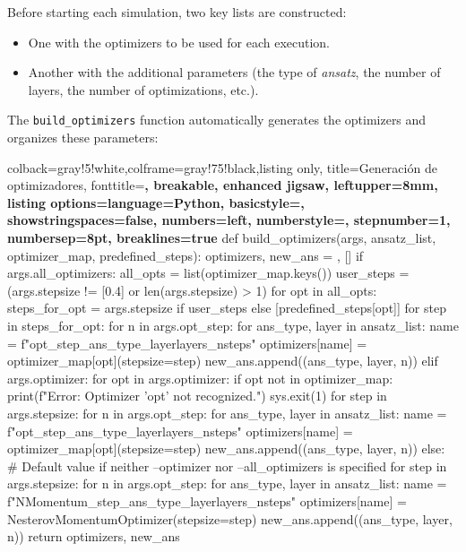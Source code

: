 Before starting each simulation, two key lists are constructed:
\begin{itemize}
    \item One with the optimizers to be used for each execution.
    \item Another with the additional parameters (the type of \emph{ansatz}, the number of layers, the number of optimizations, etc.).
\end{itemize}

The \texttt{build\_optimizers} function automatically generates the optimizers and organizes these parameters:

\begin{tcblisting}{colback=gray!5!white,colframe=gray!75!black,listing only,
    title=Generación de optimizadores, fonttitle=\bfseries, breakable, enhanced jigsaw, leftupper=8mm,
    listing options={language=Python, basicstyle=\ttfamily\small,
    showstringspaces=false, numbers=left, numberstyle=\footnotesize,
    stepnumber=1, numbersep=8pt, breaklines=true}}
def build_optimizers(args, ansatz_list, optimizer_map, predefined_steps):
    optimizers, new_ans = {}, []
    if args.all_optimizers:
        all_opts = list(optimizer_map.keys())
        user_steps = (args.stepsize != [0.4] or len(args.stepsize) > 1)
        for opt in all_opts:
            steps_for_opt = args.stepsize if user_steps else [predefined_steps[opt]]
            for step in steps_for_opt:
                for n in args.opt_step:
                    for ans_type, layer in ansatz_list:
                        name = f"{opt}_{step}_{ans_type}_{layer}layers_{n}steps"
                        optimizers[name] = optimizer_map[opt](stepsize=step)
                        new_ans.append((ans_type, layer, n))
    elif args.optimizer:
        for opt in args.optimizer:
            if opt not in optimizer_map:
                print(f"Error: Optimizer '{opt}' not recognized.")
                sys.exit(1)
            for step in args.stepsize:
                for n in args.opt_step:
                    for ans_type, layer in ansatz_list:
                        name = f"{opt}_{step}_{ans_type}_{layer}layers_{n}steps"
                        optimizers[name] = optimizer_map[opt](stepsize=step)
                        new_ans.append((ans_type, layer, n))
    else:
        # Default value if neither --optimizer nor --all_optimizers is specified
        for step in args.stepsize:
            for n in args.opt_step:
                for ans_type, layer in ansatz_list:
                    name = f"NMomentum_{step}_{ans_type}_{layer}layers_{n}steps"
                    optimizers[name] = NesterovMomentumOptimizer(stepsize=step)
                    new_ans.append((ans_type, layer, n))
    return optimizers, new_ans
\end{tcblisting}

